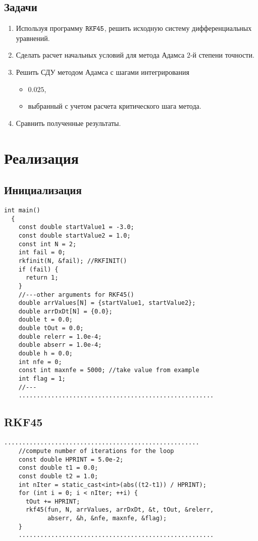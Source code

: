 \documentclass[a4paper,11pt]{article}
\begin{document}
\subsection{Задачи}
\begin{enumerate}
  \item Используя программу $\verb|RKF45|$, решить исходную систему дифференциальных уравнений.
  \item Сделать расчет начальных условий для метода Адамса $2$-й степени точности.
  \item Решить СДУ методом Адамса с шагами интегрирования
    \begin{itemize}
      \item $0.025$,
      \item выбранный с учетом расчета критического шага метода.
    \end{itemize}
    \item Сравнить полученные результаты.
\end{enumerate}
\newpage

\section{Реализация}
\subsection{Инициализация}
\begin{lstlisting}[label=start, caption=Starting values]
  int main()
  {
    const double startValue1 = -3.0;
    const double startValue2 = 1.0;
    const int N = 2;
    int fail = 0;
    rkfinit(N, &fail); //RKFINIT()
    if (fail) {
      return 1;
    }
    //---other arguments for RKF45()
    double arrValues[N] = {startValue1, startValue2};
    double arrDxDt[N] = {0.0};
    double t = 0.0;
    double tOut = 0.0;
    double relerr = 1.0e-4;
    double abserr = 1.0e-4;
    double h = 0.0;
    int nfe = 0;
    const int maxnfe = 5000; //take value from example
    int flag = 1;
    //---
    ......................................................
\end{lstlisting}

\subsection{RKF45}
\begin{lstlisting}[label=rkf45, caption=RKF45]
    ......................................................
    //compute number of iterations for the loop
    const double HPRINT = 5.0e-2;
    const double t1 = 0.0;
    const double t2 = 1.0;
    int nIter = static_cast<int>(abs((t2-t1)) / HPRINT);
    for (int i = 0; i < nIter; ++i) {
      tOut += HPRINT;
      rkf45(fun, N, arrValues, arrDxDt, &t, tOut, &relerr,
            abserr, &h, &nfe, maxnfe, &flag);
    }
    ......................................................
\end{lstlisting}
\newpage
\end{document}
